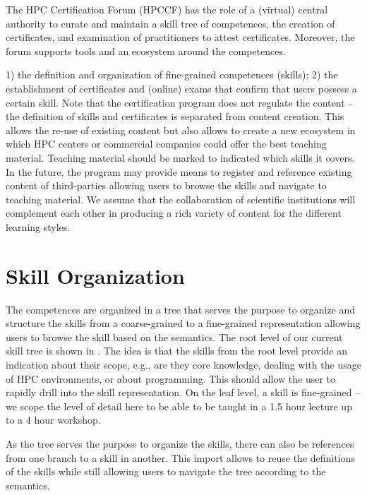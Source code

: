 \documentclass[jocse]{jocseart}
\newcommand{\jk}[1]{\todo[inline]{TODO: #1}}
\begin{document}
The HPC Certification Forum (HPCCF) has the role of a (virtual) central authority to curate and maintain a skill tree of competences, the creation of certificates, and examination of practitioners to attest certificates.
Moreover, the forum supports tools and an ecosystem around the competences.

\jk{Integrate}

1) the definition and organization of fine-grained competences (skills);
2) the establishment of certificates and (online) exams that confirm that users possess a certain skill.
Note that the certification program does not regulate the content -- the definition of skills and certificates is separated from content creation.
This allows the re-use of existing content but also allows to create a new ecosystem in which HPC centers or commercial companies could offer the best teaching material.
Teaching material should be marked to indicated which skills it covers.
In the future, the program may provide means to register and reference existing content of third-parties allowing users to browse the skills and navigate to teaching material.
We assume that the collaboration of scientific institutions will complement each other in producing a rich variety of content for the different learning styles.



\section{Skill Organization}

The competences are organized in a tree that serves the purpose to organize and structure the skills from a coarse-grained to a fine-grained representation allowing users to browse the skill based on the semantics.
The root level of our current skill tree is shown in .
The idea is that the skills from the root level provide an indication about their scope,
e.g., are they core knowledge, dealing with the usage of HPC environments, or about programming.
This should allow the user to rapidly drill into the skill representation.
On the leaf level, a skill is fine-grained -- we scope the level of detail here to be able to be taught in a 1.5 hour lecture up to a 4 hour workshop.

As the tree serves the purpose to organize the skills, there can also be references from one branch to a skill in another.
This import allows to reuse the definitions of the skills while still allowing users to navigate the tree according to the semantics.
\end{document}
